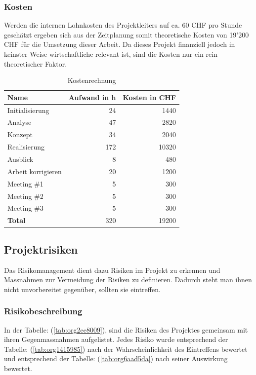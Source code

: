 \subsubsection{Kosten}
\label{sec:org3e4bd81}

Werden die internen Lohnkosten des Projektleiters auf ca. 60 CHF pro Stunde
geschätzt ergeben sich aus der Zeitplanung somit theoretische Kosten von 19'200
CHF für die Umsetzung dieser Arbeit. Da dieses Projekt finanziell jedoch in
keinster Weise wirtschaftliche relevant ist, sind die Kosten nur ein rein
theoretischer Faktor.
\begin{table}[htbp]
\centering
\begin{tabular}{lrr}
\hline
\textbf{Name}\cellcolor[HTML]{C0C0C0} & \textbf{Aufwand in h}\cellcolor[HTML]{C0C0C0} & \textbf{Kosten in CHF}\cellcolor[HTML]{C0C0C0}\\
\hline
Initialisierung & 24 & 1440\\
Analyse & 47 & 2820\\
Konzept & 34 & 2040\\
Realisierung & 172 & 10320\\
Ausblick & 8 & 480\\
Arbeit korrigieren & 20 & 1200\\
Meeting \#1 & 5 & 300\\
Meeting \#2 & 5 & 300\\
Meeting \#3 & 5 & 300\\
\hline
\textbf{Total} & 320 & 19200\\
\hline
\end{tabular}
\caption{\label{tab:org60421fb}
Kostenrechnung}

\end{table}

\subsection{Projektrisiken}
\label{sec:orge73eaac}

Das Risikomanagement dient dazu Risiken im Projekt zu erkennen und Massnahmen
zur Vermeidung der Risiken zu definieren. Dadurch steht man ihnen nicht
unvorbereitet gegenüber, sollten sie eintreffen.

\subsubsection{Risikobeschreibung}
\label{sec:org5560dc3}

In der Tabelle: (\ref{tab:org2ee8009}), sind die Risiken des Projektes
gemeinsam mit ihren Gegenmassnahmen aufgelistet. Jedes Risiko wurde
entsprechend der Tabelle: (\ref{tab:org1415985}) nach der Wahrscheinlichkeit
des Eintreffens bewertet und entsprechend der Tabelle: (\ref{tab:org6aad5da}) nach
seiner Auswirkung bewertet.

